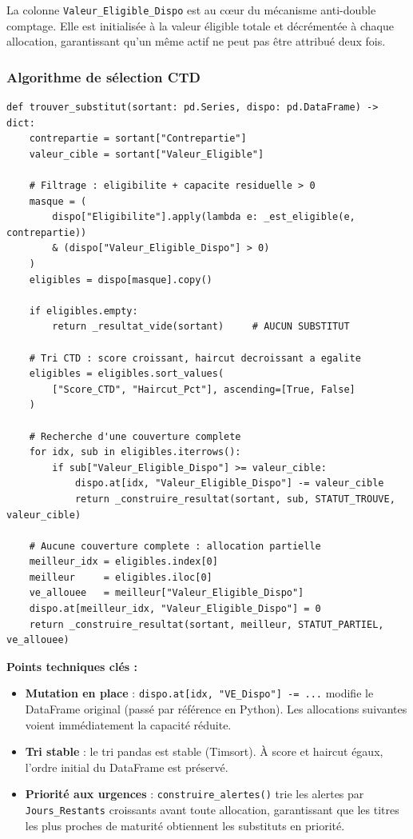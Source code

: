 \documentclass[12pt,a4paper]{article}
\begin{document}
La colonne \texttt{Valeur\_Eligible\_Dispo} est au cœur du mécanisme anti-double
comptage. Elle est initialisée à la valeur éligible totale et décrémentée à chaque
allocation, garantissant qu'un même actif ne peut pas être attribué deux fois.

\subsubsection{Algorithme de sélection CTD}

\begin{lstlisting}[caption={Sélection du meilleur substitut pour un titre sortant}]
def trouver_substitut(sortant: pd.Series, dispo: pd.DataFrame) -> dict:
    contrepartie = sortant["Contrepartie"]
    valeur_cible = sortant["Valeur_Eligible"]

    # Filtrage : eligibilite + capacite residuelle > 0
    masque = (
        dispo["Eligibilite"].apply(lambda e: _est_eligible(e, contrepartie))
        & (dispo["Valeur_Eligible_Dispo"] > 0)
    )
    eligibles = dispo[masque].copy()

    if eligibles.empty:
        return _resultat_vide(sortant)     # AUCUN SUBSTITUT

    # Tri CTD : score croissant, haircut decroissant a egalite
    eligibles = eligibles.sort_values(
        ["Score_CTD", "Haircut_Pct"], ascending=[True, False]
    )

    # Recherche d'une couverture complete
    for idx, sub in eligibles.iterrows():
        if sub["Valeur_Eligible_Dispo"] >= valeur_cible:
            dispo.at[idx, "Valeur_Eligible_Dispo"] -= valeur_cible
            return _construire_resultat(sortant, sub, STATUT_TROUVE, valeur_cible)

    # Aucune couverture complete : allocation partielle
    meilleur_idx = eligibles.index[0]
    meilleur     = eligibles.iloc[0]
    ve_allouee   = meilleur["Valeur_Eligible_Dispo"]
    dispo.at[meilleur_idx, "Valeur_Eligible_Dispo"] = 0
    return _construire_resultat(sortant, meilleur, STATUT_PARTIEL, ve_allouee)
\end{lstlisting}

\textbf{Points techniques clés :}
\begin{itemize}
  \item \textbf{Mutation en place} : \texttt{dispo.at[idx, "VE\_Dispo"] -= ...} modifie
    le DataFrame original (passé par référence en Python). Les allocations suivantes
    voient immédiatement la capacité réduite.
  \item \textbf{Tri stable} : le tri pandas est stable (Timsort). À score et haircut égaux,
    l'ordre initial du DataFrame est préservé.
  \item \textbf{Priorité aux urgences} : \texttt{construire\_alertes()} trie les alertes
    par \texttt{Jours\_Restants} croissants avant toute allocation, garantissant que les
    titres les plus proches de maturité obtiennent les substituts en priorité.
\end{itemize}
\end{document}
